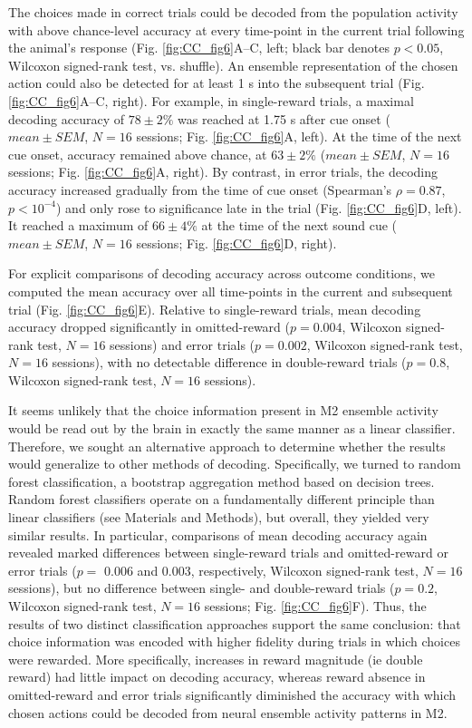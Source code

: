 The choices made in correct trials could be decoded from the population activity with above chance-level accuracy at every time-point in the current trial following the animal’s response (Fig. \ref{fig:CC_fig6}A–C, left; black bar denotes $p < 0.05$, Wilcoxon signed-rank test, vs. shuffle). An ensemble representation of the chosen action could also be detected for at least 1 s into the subsequent trial (Fig. \ref{fig:CC_fig6}A–C, right). For example, in single-reward trials, a maximal decoding accuracy of $78 \pm 2\%$ was reached at 1.75 s after cue onset ($mean \pm SEM$, $N = 16$ sessions; Fig. \ref{fig:CC_fig6}A, left). At the time of the next cue onset, accuracy remained above chance, at $63 \pm 2\%$ ($mean \pm SEM$, $N = 16$ sessions; Fig. \ref{fig:CC_fig6}A, right). By contrast, in error trials, the decoding accuracy increased gradually from the time of cue onset (Spearman's $\rho = 0.87$, $p < 10^{-4}$) and only rose to significance late in the trial (Fig. \ref{fig:CC_fig6}D, left). It reached a maximum of $66 \pm 4\%$ at the time of the next sound cue ($mean \pm SEM$, $N = 16$ sessions; Fig. \ref{fig:CC_fig6}D, right).



For explicit comparisons of decoding accuracy across outcome conditions, we computed the mean accuracy over all time-points in the current and subsequent trial (Fig. \ref{fig:CC_fig6}E). Relative to single-reward trials, mean decoding accuracy dropped significantly in omitted-reward ($p = 0.004$, Wilcoxon signed-rank test, $N = 16$ sessions) and error trials ($p = 0.002$, Wilcoxon signed-rank test, $N = 16$ sessions), with no detectable difference in double-reward trials ($p = 0.8$, Wilcoxon signed-rank test, $N = 16$ sessions).

It seems unlikely that the choice information present in M2 ensemble activity would be read out by the brain in exactly the same manner as a linear classifier. Therefore, we sought an alternative approach to determine whether the results would generalize to other methods of decoding. Specifically, we turned to random forest classification, a bootstrap aggregation method based on decision trees. Random forest classifiers operate on a fundamentally different principle than linear classifiers (see Materials and Methods), but overall, they yielded very similar results. In particular, comparisons of mean decoding accuracy again revealed marked differences between single-reward trials and omitted-reward or error trials ($p =$ 0.006 and 0.003, respectively, Wilcoxon signed-rank test, $N = 16$ sessions), but no difference between single- and double-reward trials ($p = 0.2$, Wilcoxon signed-rank test, $N = 16$ sessions; Fig. \ref{fig:CC_fig6}F). Thus, the results of two distinct classification approaches support the same conclusion: that choice information was encoded with higher fidelity during trials in which choices were rewarded. More specifically, increases in reward magnitude (ie double reward) had little impact on decoding accuracy, whereas reward absence in omitted-reward and error trials significantly diminished the accuracy with which chosen actions could be decoded from neural ensemble activity patterns in M2.

